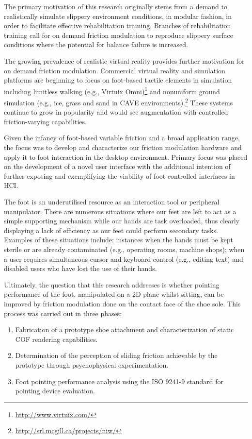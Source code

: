 \documentclass [12pt,letterpaper]{report}
\begin{document}
The primary motivation of this research originally stems from a demand to realistically simulate slippery environment conditions, in modular fashion, in order to facilitate effective rehabilitation training. Branches of rehabilitation training call for on demand friction modulation to reproduce slippery surface conditions where the potential for balance failure is increased.

The growing prevalence of realistic virtual reality provides further motivation for on demand friction modulation. Commercial virtual reality and simulation platforms are beginning to focus on foot-based tactile elements in simulation including limitless walking (e.g., Virtuix Omni)\footnote{\url{http://www.virtuix.com/}} and nonuniform ground simulation (e.g., ice, grass and sand in CAVE environments).\footnote{\url{http://srl.mcgill.ca/projects/niw/}} These systems continue to grow in popularity and would see augmentation with controlled friction-varying capabilities.

Given the infancy of foot-based variable friction and a broad application range, the focus was to develop and characterize our friction modulation hardware and apply it to foot interaction in the desktop environment. Primary focus was placed on the development of a novel user interface with the additional intention of further exposing and exemplifying the viability of foot-controlled interfaces in HCI.

The foot is an underutilised resource as an interaction tool or peripheral manipulator. There are numerous situations where our feet are left to act as a simple supporting mechanism while our hands are task overloaded, thus clearly displaying a lack of efficiency as our feet could perform secondary tasks. Examples of these situations include: instances when the hands must be kept sterile or are already contaminated (e.g., operating rooms, machine shops); when a user requires simultaneous cursor and keyboard control (e.g., editing text) and disabled users who have lost the use of their hands.

Ultimately, the question that this research addresses is whether pointing performance of the foot, manipulated on a 2D plane whilst sitting, can be improved by friction modulation done on the contact face of the shoe sole. This process was carried out in three phases:

\begin{enumerate}
	\item Fabrication of a prototype shoe attachment and characterization of static COF rendering capabilities.
	\item Determination of the perception of sliding friction achievable by the prototype through psychophysical experimentation.
	\item Foot pointing performance analysis using the ISO 9241-9 standard for pointing device evaluation.
\end{enumerate}
\end{document}
